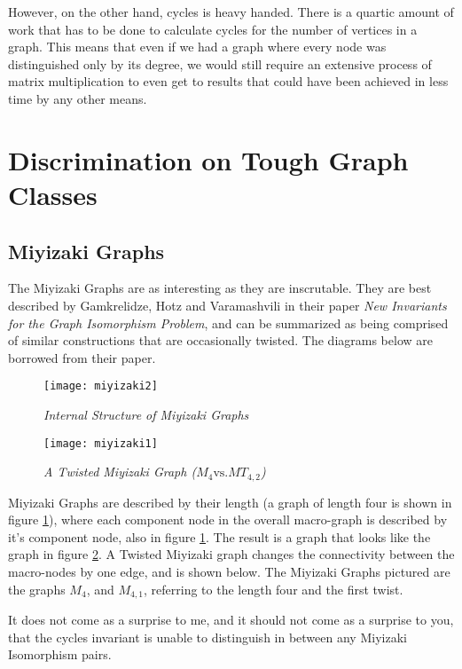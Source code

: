 However, on the other hand, cycles is heavy handed. There is a quartic amount of work that has to be done to calculate cycles for the number of vertices in a graph.
This means that even if we had a graph where every node was distinguished only by its degree, we would still require an extensive process of matrix multiplication to even get to results that could have been achieved in less time by any other means.

\section{Discrimination on Tough Graph Classes}

\subsection{Miyizaki Graphs}
The Miyizaki Graphs are as interesting as they are inscrutable.
They are best described by Gamkrelidze, Hotz and Varamashvili in their paper \emph{New Invariants for the Graph Isomorphism Problem}, and can be summarized as being comprised of similar constructions that are occasionally twisted.
The diagrams below are borrowed from their paper.

\begin{figure}[h]
\caption{\emph{Internal Structure of Miyizaki Graphs}}
\centering
\texttt{[image: miyizaki2]}
\label{fig:miyizaki2}
\end{figure}

\begin{figure}[h]
\caption{\emph{A Twisted Miyizaki Graph ($M_4 \text{vs.} MT_{4,2}$)}}
\centering
\texttt{[image: miyizaki1]}
\label{fig:miyizaki1}
\end{figure}

Miyizaki Graphs are described by their length (a graph of length four is shown in figure \ref{fig:miyizaki2}), where each component node in the overall macro-graph is described by it's component node, also in figure \ref{fig:miyizaki2}.
The result is a graph that looks like the graph in figure \ref{fig:miyizaki1}.
A Twisted Miyizaki graph changes the connectivity between the macro-nodes by one edge, and is shown below.
The Miyizaki Graphs pictured are the graphs  $M_4$, and $M_{4, 1}$, referring to the length four and the first twist.

It does not come as a surprise to me, and it should not come as a surprise to you, that the cycles invariant is unable to distinguish in between any Miyizaki Isomorphism pairs.

